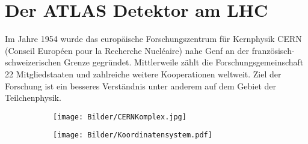 \section{Der ATLAS Detektor am LHC}\label{ATLAS}%
Im Jahre 1954 wurde das europäische Forschungszentrum für Kernphysik CERN (Conseil Européen pour la Recherche Nucléaire) nahe Genf an der französisch-schweizerischen Grenze gegründet. Mittlerweile zählt die Forschungsgemeinschaft 22 Mitgliedstaaten und zahlreiche weitere Kooperationen weltweit. Ziel der Forschung ist ein besseres Verständnis unter anderem auf dem Gebiet der Teilchenphysik.\\
\begin{figure}
  \centering
   \begin{subfigure}[t]{0.7\textwidth}
  \texttt{[image: Bilder/CERNKomplex.jpg]}
  \label{CERNKomplex}
  \end{subfigure}
\begin{subfigure}[t]{0.7\textwidth}
 \texttt{[image: Bilder/Koordinatensystem.pdf]}
  \label{Koordinatensystem}
\end{subfigure}
\caption[Schematischer Überblick von Experimenten am CERN und das bei ATLAS festgelegte Koordinatensystem.]{}
\label{CERNKomplexUNDKoordinatensystem}
\end{figure}

